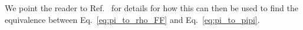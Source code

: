 We point the reader to Ref.~\cite{Briceno:2016kkp} for details for how this can then be used to find the equivalence between Eq.~\ref{eq:pi_to_rho_FF} and Eq.~\ref{eq:pi_to_pipi}.



%
%
%
%
%
%
%
%
%
